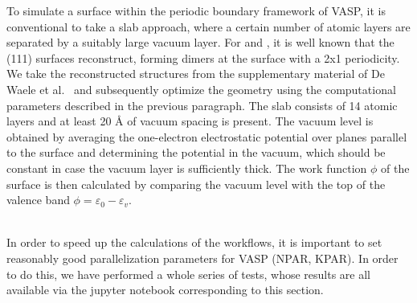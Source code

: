 \begin{refsection}
To simulate a surface within the periodic boundary framework of VASP, it is conventional to take a slab approach, where a certain number of atomic layers are separated by a suitably large vacuum layer. For  and , it is well known that the (111) surfaces reconstruct, forming dimers at the surface with a 2x1 periodicity. We take the reconstructed structures from the supplementary material of De Waele et al.~\cite{DeWaele2016} and subsequently optimize the geometry using the computational parameters described in the previous paragraph. The slab consists of 14 atomic layers and at least 20 \si{\angstrom} of vacuum spacing is present. The vacuum level is obtained by averaging the one-electron electrostatic potential over planes parallel to the surface and determining the potential in the vacuum, which should be constant in case the vacuum layer is sufficiently thick. The work function $\phi$ of the surface is then calculated by comparing the vacuum level with the top of the valence band $\phi = \varepsilon_0 - \varepsilon_v$.


\label{appendix:sec-parallel}\\
In order to speed up the calculations of the workflows, it is important to set reasonably good parallelization parameters for VASP (NPAR, KPAR). In order to do this, we have performed a whole series of tests, whose results are all available via the jupyter notebook corresponding to this section.

\printbibliography
\end{refsection}